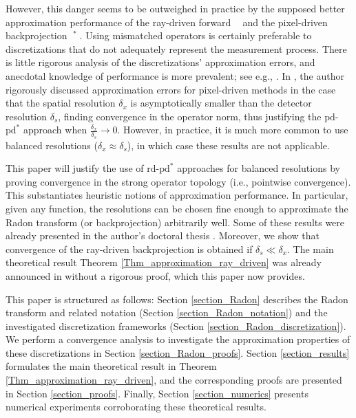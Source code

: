 \documentclass[11pt,reqno]{amsart}
\DeclareMathOperator{\RayRadon}{\mathcal{R}^\mathrm{rd}_{\delta}}
\DeclareMathOperator{\PixelRadon}{\mathcal{R}^\mathrm{pd}_{\delta}}
\numberwithin{theorem}{section}
\theoremstyle{remark}
\begin{document}
However, this danger seems to be outweighed in practice by the supposed better approximation performance of the ray-driven forward $\RayRadon$ and the pixel-driven backprojection $\PixelRadon^*$.
Using mismatched operators is certainly preferable to discretizations that do not adequately represent the measurement process.
There is little rigorous analysis of the discretizations' approximation errors, and anecdotal knowledge of performance is more prevalent; see e.g., \cite{322963,Qiao2017ThreeNA,Liu_GPU_DDP_2017}.
In \cite{doi:10.1137/20M1326635}, the author rigorously discussed approximation errors for pixel-driven methods in the case that the spatial resolution $\delta_x$ is asymptotically smaller than the detector resolution $\delta_s$, finding convergence in the operator norm, thus justifying the $\mathrm{pd}$-$\mathrm{pd}^*$ approach when $\frac{\delta_x}{\delta_s}\to 0$. 
However, in practice, it is much more common to use balanced resolutions ($\delta_x\approx \delta_s$), in which case these results are not applicable.


This paper will justify the use of $\mathrm{rd}$-$\mathrm{pd}^*$ approaches for balanced resolutions by proving convergence in the strong operator topology (i.e., pointwise convergence). This substantiates heuristic notions of approximation performance. In particular, given any function, the resolutions can be chosen fine enough to approximate the Radon transform (or backprojection) arbitrarily well. Some of these results were  already presented in the author's doctoral thesis \cite{huber2022pixel}. Moreover, we show that convergence of the ray-driven backprojection is obtained if $\delta_s \ll \delta_x$. The main theoretical result Theorem \ref{Thm_approximation_ray_driven} was already announced in \cite{10.1007/978-3-031-92366-1_11} without a rigorous proof, which this paper now provides.


This paper is structured as follows: Section \ref{section_Radon} describes the Radon transform and related notation (Section \ref{section_Radon_notation}) and the investigated discretization frameworks (Section \ref{section_Radon_discretization}). We perform a convergence analysis to investigate the approximation properties of these discretizations in Section \ref{section_Radon_proofs}. Section \ref{section_results} formulates the main theoretical result in Theorem \ref{Thm_approximation_ray_driven}, and the corresponding proofs are presented in Section \ref{section_proofs}.
Finally, Section \ref{section_numerics} presents numerical experiments corroborating these theoretical results.
\end{document}
